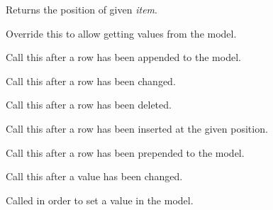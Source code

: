 Returns the position of given {\it item}.

\label{wxdataviewindexlistmodelgetvalue}


Override this to allow getting values from the model.

\label{wxdataviewindexlistmodelrowappended}


Call this after a row has been appended to the model.

\label{wxdataviewindexlistmodelrowchanged}


Call this after a row has been changed.

\label{wxdataviewindexlistmodelrowdeleted}


Call this after a row has been deleted.

\label{wxdataviewindexlistmodelrowinserted}


Call this after a row has been inserted at the given position.

\label{wxdataviewindexlistmodelrowprepended}


Call this after a row has been prepended to the model.

\label{wxdataviewindexlistmodelrowvaluechanged}


Call this after a value has been changed.

\label{wxdataviewindexlistmodelsetvalue}


Called in order to set a value in the model.
